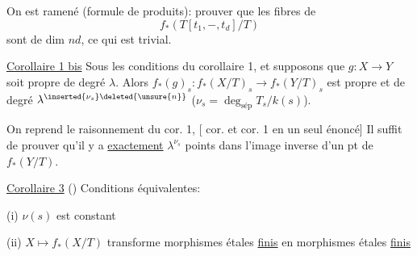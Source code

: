 On est ramené (formule de produits): prouver que les fibres de
\[
f_*(T[t_1,-,t_d]/T)
\]
sont de dim $nd$, ce qui est trivial.

\uline{Corollaire 1 bis} Sous les conditions du corollaire 1,
  et supposons que   $g:X\to Y$ soit propre de degré  $\lambda$.
Alors $f_*(g)_s:f_*(X/T)_s\to f_*(Y/T)_s$ est propre et de degré $\lambda^{\inserted{\nu_s}\deleted{\unsure{n}}}$ ($\nu_s=\deg_{\mathrm{sép}}T_s/k(s)$).

On reprend le raisonnement du cor. 1,
[ cor.  et cor. 1 en un seul énoncé]
Il suffit de prouver qu'il y a \uline{exactement} $\lambda^{\nu_s}$ points dans l'image inverse d'un pt de $f_*(Y/T)$.

\uline{Corollaire 3} ()   Conditions équivalentes:

(i) $\nu(s)$ est  constant

(ii) $X\mapsto f_*(X/T)$ transforme morphismes  étales \uline{finis} en morphismes étales \uline{finis}

